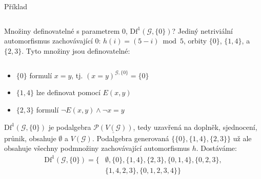 \documentclass{beamer}
\begin{document}
\begin{frame}{Příklad}

    \vspace{6pt}

    \begin{columns}

        \begin{column}{0.8\textwidth}            
            Množiny definovatelné s parametrem $0$, $\mathrm{Df}^1(\mathcal G,\{0\})$? Jediný netriviální automorfismus zachovávající $0$: \alert{$h(i)=(5-i) \bmod 5$}, orbity $\{0\}$, $\{1,4\}$, a $\{2,3\}$. Tyto množiny jsou definovatelné:            
        \end{column} 

        \begin{column}{0.2\textwidth}            
        \end{column}

    \end{columns}

    \begin{itemize}
        \item $\{0\}$ formulí $x=y$, tj. $(x=y)^{\mathcal G,\{0\}}=\{0\}$
        \item $\{1,4\}$ lze definovat pomocí $E(x,y)$
        \item $\{2,3\}$ formulí $\neg E(x,y)\land \neg x=y$
    \end{itemize}
    $\mathrm{Df}^1(\mathcal G,\{0\})$ je podalgebra $\underline{\mathcal P(V(\mathcal G))}$, tedy uzavřená na doplněk, sjednocení, průnik, obsahuje $\emptyset$ a $V(\mathcal G)$. Podalgebra generovaná $\{\{0\},\{1,4\},\{2,3\}\}$ už ale obsahuje všechny podmnožiny zachovávající automorfismus $h$. Dostáváme:
    \begin{align*}        
        \mathrm{Df}^1(\mathcal G,\{0\})=\{&\emptyset, \{0\}, \{1,4\}, \{2,3\}, \{0,1,4\}, \{0,2,3\}, \\ &\{1,4,2,3\}, \{0,1,2,3,4\}\}        
    \end{align*}
    
\end{frame}
\end{document}
